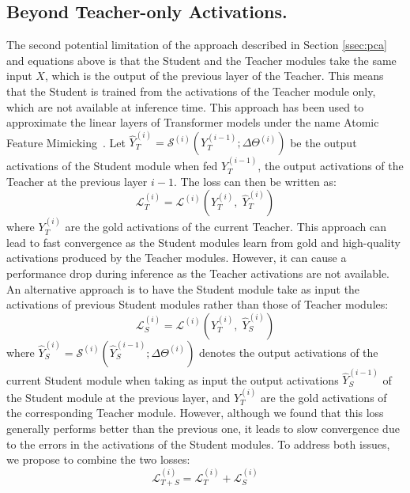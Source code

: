 \subsection{Beyond Teacher-only Activations.}
The second potential limitation of the approach described in Section \ref{ssec:pca} and equations above is that the Student and the Teacher modules take the same input $X$, which is the output of the previous layer of the Teacher. This means that the Student is trained from the activations of the Teacher module only, which are not available at inference time. This approach has been used to approximate the linear layers of Transformer models under the name Atomic Feature Mimicking~\citep{yu_compressing_2023}. Let $\widehat{Y}^{(i)}_{T} = \mathcal{S}^{(i)}(Y^{(i-1)}_{T}; \Delta \Theta^{(i)})$ be the output activations of the Student module when fed $Y^{(i-1)}_{T}$, the output activations of the Teacher at the previous layer $i-1$. The loss can then be written as:
\begin{equation}
\mathcal{L}^{(i)}_{T} = \mathcal{L}^{(i)}(Y^{(i)}_{T}, \; \widehat{Y}^{(i)}_{T})
\end{equation}
where $Y^{(i)}_{T}$ are the gold activations of the current Teacher. This approach can lead to fast convergence as the Student modules learn from gold and high-quality activations produced by the Teacher modules. However, it can cause a performance drop during inference as the Teacher activations are not available. An alternative approach is to have the Student module take as input the activations of previous Student modules rather than those of Teacher modules:
\begin{equation}
\mathcal{L}^{(i)}_{S} = \mathcal{L}^{(i)}(Y^{(i)}_{T}, \; \widehat{Y}^{(i)}_{S})
\end{equation}
where $\widehat{Y}^{(i)}_{S} = \mathcal{S}^{(i)}(\widehat{Y}^{(i-1)}_{S}; \Delta \Theta^{(i)})$ denotes the output activations of the current Student module when taking as input the output activations $\widehat{Y}^{(i-1)}_{S}$ of the Student module at the previous layer, and $Y^{(i)}_{T}$ are the gold activations of the corresponding Teacher module.
However, although we found that this loss generally performs
better than the previous one, it leads to slow convergence due to
the errors in the activations of the Student modules. To address both issues,
we propose to combine the two losses:
\begin{equation}
\mathcal{L}^{(i)}_{T+S} = \mathcal{L}^{(i)}_{T} + \mathcal{L}^{(i)}_{S}
\end{equation}

